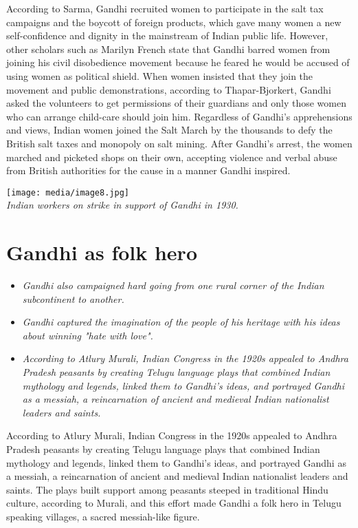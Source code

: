 According to Sarma, Gandhi recruited women to participate in the salt
tax campaigns and the boycott of foreign products, which gave many women
a new self-confidence and dignity in the mainstream of Indian public
life. However, other scholars such as Marilyn French state that Gandhi
barred women from joining his civil disobedience movement because he
feared he would be accused of using women as political shield. When
women insisted that they join the movement and public demonstrations,
according to Thapar-Bjorkert, Gandhi asked the volunteers to get
permissions of their guardians and only those women who can arrange
child-care should join him. Regardless of Gandhi's apprehensions and
views, Indian women joined the Salt March by the thousands to defy the
British salt taxes and monopoly on salt mining. After Gandhi's arrest,
the women marched and picketed shops on their own, accepting violence
and verbal abuse from British authorities for the cause in a manner
Gandhi inspired.

\texttt{[image: media/image8.jpg]}\\
\emph{Indian workers on strike in support of Gandhi in 1930.}

\section{Gandhi as folk hero}\label{gandhi-as-folk-hero}

\begin{itemize}
\item
  \emph{Gandhi also campaigned hard going from one rural corner of the
  Indian subcontinent to another.}
\item
  \emph{Gandhi captured the imagination of the people of his heritage
  with his ideas about winning "hate with love".}
\item
  \emph{According to Atlury Murali, Indian Congress in the 1920s
  appealed to Andhra Pradesh peasants by creating Telugu language plays
  that combined Indian mythology and legends, linked them to Gandhi's
  ideas, and portrayed Gandhi as a messiah, a reincarnation of ancient
  and medieval Indian nationalist leaders and saints.}
\end{itemize}

According to Atlury Murali, Indian Congress in the 1920s appealed to
Andhra Pradesh peasants by creating Telugu language plays that combined
Indian mythology and legends, linked them to Gandhi's ideas, and
portrayed Gandhi as a messiah, a reincarnation of ancient and medieval
Indian nationalist leaders and saints. The plays built support among
peasants steeped in traditional Hindu culture, according to Murali, and
this effort made Gandhi a folk hero in Telugu speaking villages, a
sacred messiah-like figure.


